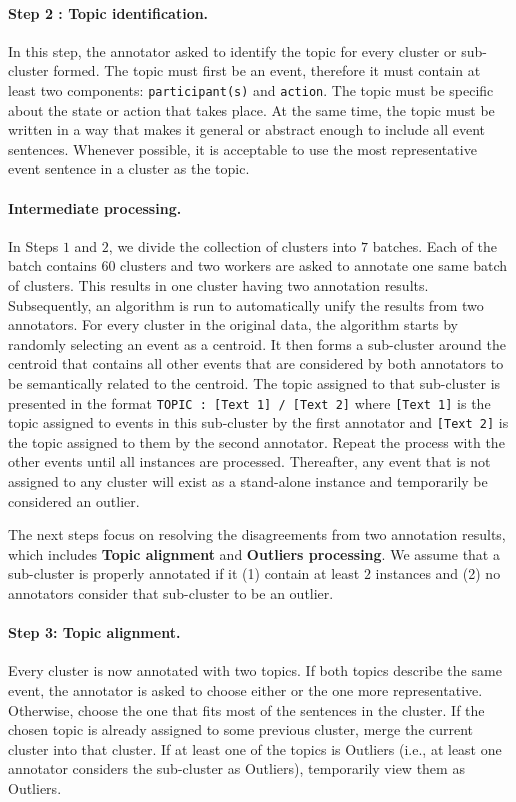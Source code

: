 	
\paragraph{Step 2 : Topic identification.}

In this step, the annotator asked to identify the topic for every cluster or sub-cluster formed. The topic must first be an event, therefore it must contain at least two components: \texttt{participant(s)} and \texttt{action}. The topic must be specific about the state or action that takes place. At the same time, the topic must be written in a way that makes it general or abstract enough to include all event sentences.	Whenever possible, it is acceptable to use the most representative event sentence in a cluster as the topic.	

\paragraph{Intermediate processing.} In Steps $1$ and $2$, we divide the collection of clusters into $7$ batches. Each of the batch contains $60$ clusters and 
two workers are asked to annotate one same batch of clusters. This results in one cluster having two annotation results. Subsequently, an algorithm is run to automatically unify the results from two annotators. For every cluster in the original data, the algorithm starts by randomly selecting an event as a centroid. It then forms a sub-cluster around the centroid that contains all other events that are considered by both annotators to be semantically related to the centroid. The topic assigned to that sub-cluster is presented in the format \texttt{TOPIC : [Text 1] / [Text 2]} where \texttt{[Text 1]} is the topic assigned to events in this sub-cluster by the first annotator and \texttt{[Text 2]} is the topic assigned to them by the second annotator. Repeat the process with the other events until all instances are processed. Thereafter, any event that is not assigned to any cluster will exist as a stand-alone instance and temporarily be considered an outlier. 

The next steps focus on resolving the disagreements from two annotation results, which includes \textbf{Topic alignment} and \textbf{Outliers processing}. We assume that a sub-cluster is properly annotated if it (1) contain at least $2$ instances and (2) no annotators consider that sub-cluster to be an outlier.

\paragraph{Step 3: Topic alignment.}
Every cluster is now annotated with two topics. If both topics describe the same event, the annotator is asked to choose either or the one more representative. Otherwise, choose the one that fits most of the sentences in the cluster. If the chosen topic is already assigned to some previous cluster, merge the current cluster into that cluster. If at least one of the topics is Outliers (i.e., at least one annotator considers the sub-cluster as Outliers), temporarily view them as Outliers. 

